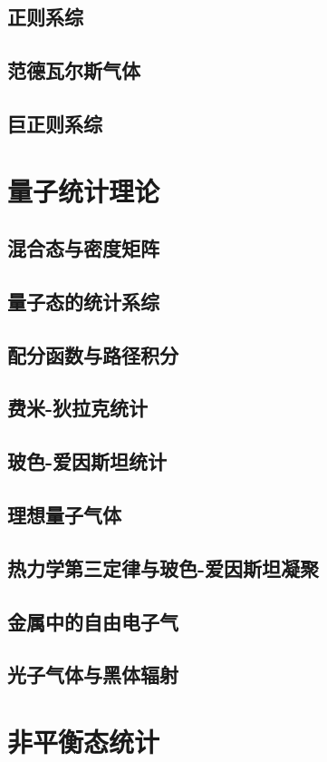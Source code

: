 \documentclass[a4paper]{report}
\begin{document}
\section{正则系综}
\section{范德瓦尔斯气体}
\section{巨正则系综}

\chapter{量子统计理论}
\section{混合态与密度矩阵}
\section{量子态的统计系综}
\section{配分函数与路径积分}
\section{费米-狄拉克统计}
\section{玻色-爱因斯坦统计}
\section{理想量子气体}
\section{热力学第三定律与玻色-爱因斯坦凝聚}
\section{金属中的自由电子气}
\section{光子气体与黑体辐射}

\chapter{非平衡态统计}
\end{document}
